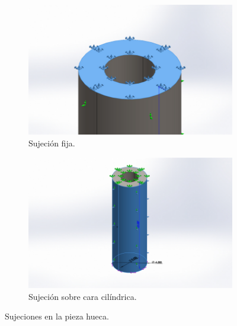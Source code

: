 \documentclass[12pt, letterpaper]{article}
\begin{document}
\begin{figure}[H]
	\centering
	\begin{subfigure}[b]{0.49\linewidth}
		\includegraphics[width=\linewidth]{suj3.png}
		\caption{Sujeción fija.}
	\end{subfigure}
	\begin{subfigure}[b]{0.49\linewidth}
		\includegraphics[width=\linewidth]{suj4.png}
		\caption{Sujeción sobre cara cilíndrica.}
	\end{subfigure}
	\caption{Sujeciones en la pieza hueca.}
\end{figure}
\end{document}
